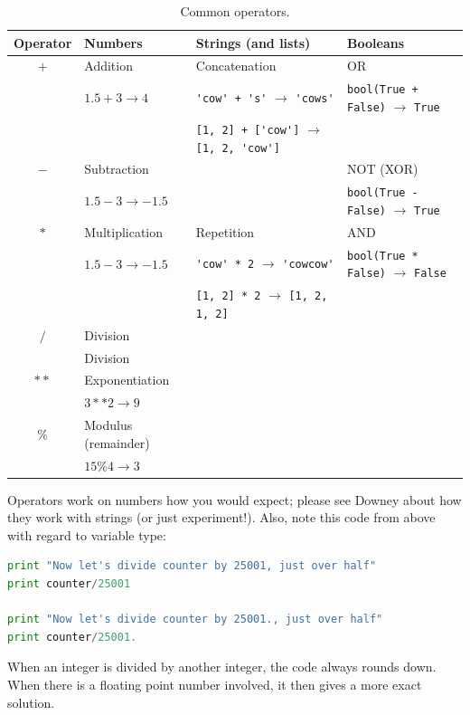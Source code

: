 \documentclass[a4paper,10pt]{scrartcl}
\begin{document}
\begin{table}[!h]
\scriptsize
\begin{tabular}{clll}
Operator	& Numbers			& Strings (and lists)							& Booleans \\
\hline
$+$		& Addition			& Concatenation								&	OR 							\\
		& $1.5 + 3 \rightarrow 4$	& \lstinline{'cow' + 's'} $\rightarrow$ \lstinline{'cows'}		& \lstinline{bool(True + False)} $\rightarrow$ \lstinline{True} \\
		& 				& \lstinline{[1, 2] + ['cow']} $\rightarrow$ \lstinline{[1, 2, 'cow']}	& 								\\
$-$		& Subtraction			&									& 	NOT (XOR)						\\
		& $1.5 - 3 \rightarrow -1.5$	& 									& \lstinline{bool(True - False)} $\rightarrow$ \lstinline{True} \\
$*$		& Multiplication		& Repetition								& 	AND							\\
		& $1.5 - 3 \rightarrow -1.5$	& \lstinline{'cow' * 2} $\rightarrow$ \lstinline{'cowcow'}		& \lstinline{bool(True * False)} $\rightarrow$ \lstinline{False} \\
		& 				& \lstinline{[1, 2] * 2} $\rightarrow$ \lstinline{[1, 2, 1, 2]}		& 								\\
$/$		& Division			& 									& 								\\
		& Division			& 									& 								\\
$**$		& Exponentiation		& 									& 								\\
		& $3**2 \rightarrow 9$		& 									& 								\\
$\%$		& Modulus (remainder)		& 									& 								\\
		& $15 \% 4 \rightarrow 3$	& 									& 								
\end{tabular}
\caption{Common operators.}
\end{table}

Operators work on numbers how you would expect; please see Downey about how they work with strings (or just experiment!). Also, note this code from above with regard to variable type:
\begin{lstlisting}[belowskip=-1.6\baselineskip, language=python]
print "Now let's divide counter by 25001, just over half"
print counter/25001

print "Now let's divide counter by 25001., just over half"
print counter/25001.
\end{lstlisting}
When an integer is divided by another integer, the code always rounds down. When there is a floating point number involved, it then gives a more exact solution.
\end{document}
